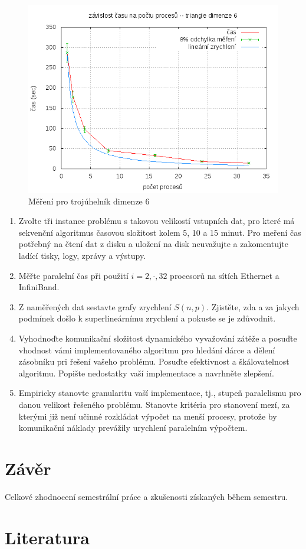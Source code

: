 \documentclass[12pt,a4paper]{article}
\begin{document}
\begin{figure}[ht]
\includegraphics[width=\textwidth]{data6.png}
\caption{Měření pro trojúhelník dimenze 6}
\label{data6}
\end{figure}

\begin{enumerate}
\item Zvolte tři instance problému s takovou velikostí vstupních dat, pro které má
sekvenční algoritmus časovou složitost kolem 5, 10 a 15 minut. Pro
meření čas potřebný na čtení dat z disku a uložení na disk
neuvažujte a zakomentujte ladící tisky, logy, zprávy a výstupy.
\item Měřte paralelní čas při použití $i=2,\cdot,32$ procesorů na sítích Ethernet a InfiniBand.
\item Z naměřených dat sestavte grafy zrychlení $S(n,p)$. Zjistěte, zda a za jakych podmínek
došlo k superlineárnímu zrychlení a pokuste se je zdůvodnit.
\item Vyhodnoďte komunikační složitost dynamického vyvažování zátěže a posuďte
vhodnost vámi implementovaného algoritmu pro hledání dárce a dělení
zásobníku pri řešení vašeho problému. Posuďte efektivnost a
škálovatelnost algoritmu. Popište nedostatky vaší implementace a
navrhněte zlepšení.
\item Empiricky stanovte
granularitu vaší implementace, tj., stupeň paralelismu pro danou
velikost řešeného problému. Stanovte kritéria pro stanovení mezí, za
kterými již není učinné rozkládat výpočet na menší procesy, protože
by komunikační náklady prevážily urychlení paralelním výpočtem.

\end{enumerate}

\section{Závěr}

Celkové zhodnocení semestrální práce a zkušenosti získaných během
semestru.

\section{Literatura}

\appendix
\end{document}
